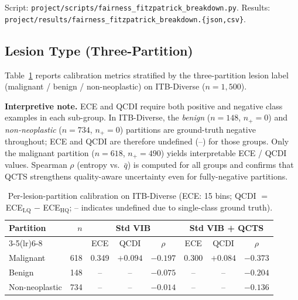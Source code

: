 \documentclass{bmvc2k}
\newcommand{\qbar}{\bar{q}}
\begin{document}
Script: \texttt{project/scripts/fairness\_fitzpatrick\_breakdown.py}.
Results: \texttt{project/results/fairness\_fitzpatrick\_breakdown.\{json,csv\}}.


\subsection{Lesion Type (Three-Partition)}
\label{app:fairness_three}

Table~\ref{tab:fairness_three} reports calibration metrics stratified by the
three-partition lesion label (malignant / benign / non-neoplastic) on
ITB-Diverse ($n{=}1{,}500$).

\textbf{Interpretive note.}
ECE and QCDI require both positive and negative class examples in each
sub-group. In ITB-Diverse, the \emph{benign} ($n{=}148$, $n_+{=}0$) and
\emph{non-neoplastic} ($n{=}734$, $n_+{=}0$) partitions are ground-truth
negative throughout; ECE and QCDI are therefore undefined (--) for those
groups. Only the malignant partition ($n{=}618$, $n_+{=}490$) yields
interpretable ECE / QCDI values. Spearman $\rho$ (entropy vs.\ $\qbar$) is
computed for all groups and confirms that QCTS strengthens quality-aware
uncertainty even for fully-negative partitions.

\begin{table}[h]
\centering
\caption{Per-lesion-partition calibration on ITB-Diverse (ECE: 15 bins;
  QCDI $=$ ECE$_\text{LQ}$ $-$ ECE$_\text{HQ}$; -- indicates undefined due
  to single-class ground truth).}
\label{tab:fairness_three}
\footnotesize
\begin{tabular}{lrcccccc}
\toprule
Partition & $n$ & \multicolumn{3}{c}{Std VIB} & \multicolumn{3}{c}{Std VIB + QCTS} \\
\cmidrule(lr){3-5}\cmidrule(lr){6-8}
& & ECE & QCDI & $\rho$ & ECE & QCDI & $\rho$ \\
\midrule
Malignant      & 618 & 0.349 & $+0.094$ & $-0.197$ & 0.300 & $+0.084$ & $-0.373$ \\
Benign         & 148 &  --   &    --    & $-0.075$ &  --   &    --    & $-0.204$ \\
Non-neoplastic & 734 &  --   &    --    & $-0.014$ &  --   &    --    & $-0.136$ \\
\bottomrule
\end{tabular}
\end{table}
\end{document}
